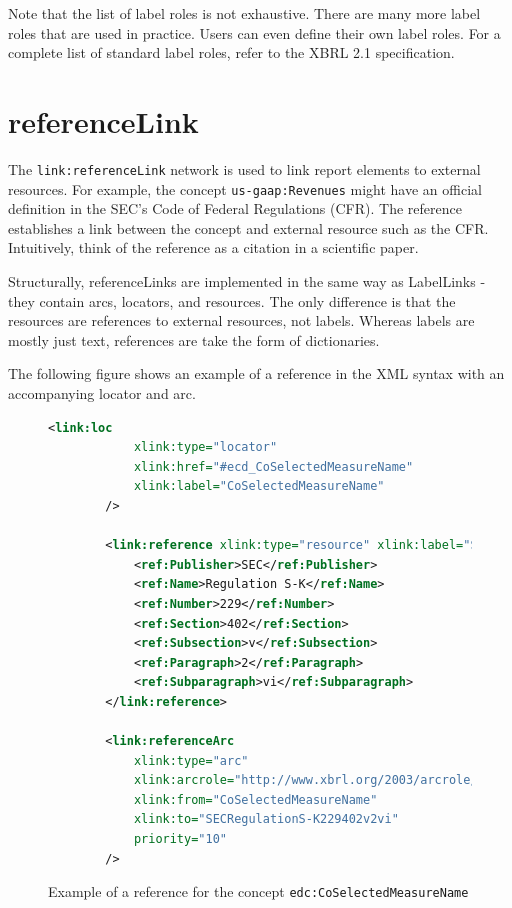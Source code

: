 Note that the list of label roles is not exhaustive.
There are many more label roles that are used in practice. 
Users can even define their own label roles.
For a complete list of standard label roles, refer to the XBRL 2.1 specification\cite{xbrl21_label_roles}.

\section{referenceLink}

The \texttt{link:referenceLink} network is used to link report elements to external resources.
For example, the concept \texttt{us-gaap:Revenues} might have an official definition in the SEC's Code of Federal Regulations (CFR).
The reference establishes a link between the concept and external resource such as the CFR.
Intuitively, think of the reference as a citation in a scientific paper.

Structurally, referenceLinks are implemented in the same way as LabelLinks - they contain arcs, locators, and resources.
The only difference is that the resources are references to external resources, not labels.
Whereas labels are mostly just text, references are take the form of dictionaries.

The following figure shows an example of a reference in the XML syntax with an accompanying locator and arc.

\begin{figure}[H]
    \begin{lstlisting}[language=XML]
        <link:loc 
            xlink:type="locator" 
            xlink:href="#ecd_CoSelectedMeasureName" 
            xlink:label="CoSelectedMeasureName"
        />
        
        <link:reference xlink:type="resource" xlink:label="SECRegulationS-K229402v2vi" xlink:role="http://www.xbrl.org/2003/role/presentationRef">
            <ref:Publisher>SEC</ref:Publisher>
            <ref:Name>Regulation S-K</ref:Name>
            <ref:Number>229</ref:Number>
            <ref:Section>402</ref:Section>
            <ref:Subsection>v</ref:Subsection>
            <ref:Paragraph>2</ref:Paragraph>
            <ref:Subparagraph>vi</ref:Subparagraph>
        </link:reference>
        
        <link:referenceArc 
            xlink:type="arc" 
            xlink:arcrole="http://www.xbrl.org/2003/arcrole/concept-reference" 
            xlink:from="CoSelectedMeasureName" 
            xlink:to="SECRegulationS-K229402v2vi" 
            priority="10"
        />
    \end{lstlisting}
    \caption{Example of a reference for the concept \texttt{edc:CoSelectedMeasureName}}
    \label{fig:example_reference_xml}
\end{figure}

